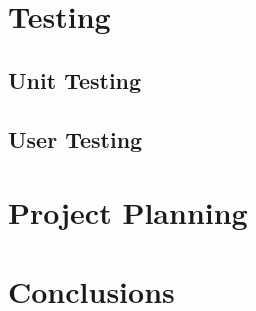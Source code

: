 \documentclass[12pt, a4paper,twoside]{report}
\theoremstyle{plain} %
\theoremstyle{definition} %
\numberwithin{equation}{chapter}
\begin{document}

\chapter{Testing}\label{ch:testing}

\section{Unit Testing}\label{sec:unittesting}

\section{User Testing}\label{sec:usertesting}


\chapter {Project Planning}\label{ch:projectplanning}


\chapter{Conclusions}\label{ch:conclusion}



\end{document}
